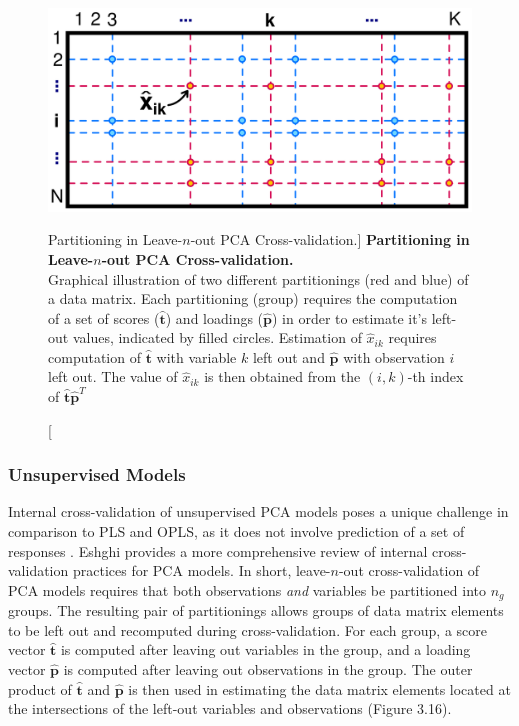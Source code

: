 \begin{figure}[h!]
\begin{center}
  \includegraphics[width=4.5in]{figs/mva/16.png}
\end{center}
\caption
      [Partitioning in Leave-$n$-out PCA Cross-validation.]{
  {\bf Partitioning in Leave-$n$-out PCA Cross-validation.}
  \\
  Graphical illustration of two different partitionings (red and blue) of a
  data matrix. Each partitioning (group) requires the computation of a set of
  scores ($\hat{\mathbf{t}}$) and loadings ($\hat{\mathbf{p}}$) in order to
  estimate it's left-out values, indicated by filled circles. Estimation of
  $\hat{x}_{ik}$ requires computation of $\hat{\mathbf{t}}$ with variable $k$
  left out and $\hat{\mathbf{p}}$ with observation $i$ left out. The value of
  $\hat{x}_{ik}$ is then obtained from the $(i,k)$-th index of
  $\hat{\mathbf{t}} \hat{\mathbf{p}}^T$
}
\end{figure}

\subsubsection{Unsupervised Models}

\begin{doublespace}
Internal cross-validation of unsupervised PCA models poses a unique challenge
in comparison to PLS and OPLS, as it does not involve prediction of a set of
responses \cite{eastment:tech1982,krzanowski:biom1987,eshghi:cils2014}. Eshghi
\cite{eshghi:cils2014} provides a more comprehensive review of internal
cross-validation practices for PCA models. In short, leave-$n$-out
cross-validation of PCA models requires that both observations \emph{and}
variables be partitioned into $n_g$ groups. The resulting pair of partitionings
allows groups of data matrix elements to be left out and recomputed during
cross-validation. For each group, a score vector $\hat{\mathbf{t}}$ is
computed after leaving out variables in the group, and a loading vector
$\hat{\mathbf{p}}$ is computed after leaving out observations in the group.
The outer product of $\hat{\mathbf{t}}$ and $\hat{\mathbf{p}}$ is then used
in estimating the data matrix elements located at the intersections of the
left-out variables and observations (Figure 3.16).
\end{doublespace}

